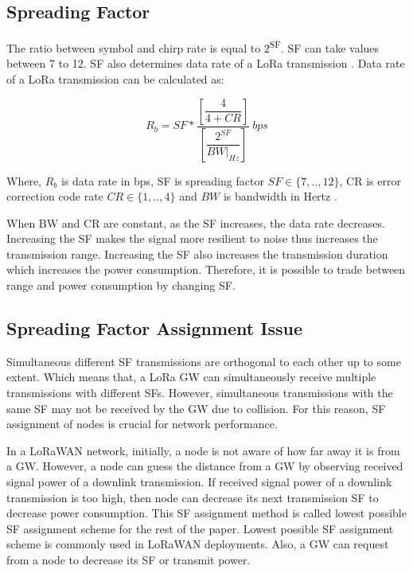 \documentclass[conference]{IEEEtran}
\begin{document}
\subsection{Spreading Factor}
\par The ratio between symbol and chirp rate is equal to $2$\textsuperscript{SF}. SF can take values between 7 to 12. SF also determines data rate of a LoRa transmission \cite{AN1200.22}. Data rate of a LoRa transmission can be calculated as:

\begin{equation} \label{eq:bit_rate_sf}
R_{b} = SF * \dfrac{\left[ \dfrac{4}{4+CR} \right] }{ \left[ \dfrac{2^{SF}}{BW|_{Hz}} \right]} \ bps
\end{equation}

Where, $R_{b}$ is data rate in bps, SF is spreading factor $SF \in \{7,..,12\}$, CR is error correction code rate $CR \in \{1,..,4\}$ and $BW$ is bandwidth in Hertz \cite{AN1200.22}.

\par When BW and CR are constant, as the SF increases, the data rate decreases. Increasing the SF makes the signal more resilient to noise thus increases the transmission range. Increasing the SF also increases the transmission duration which increases the power consumption. Therefore, it is possible to trade between range and power consumption by changing SF.

\subsection{Spreading Factor Assignment Issue}
\par Simultaneous different SF transmissions are orthogonal to each other up to some extent. Which means that, a LoRa GW can simultaneously receive multiple transmissions with different SFs. However, simultaneous transmissions with the same SF may not be received by the GW due to collision. For this reason, SF assignment of nodes is crucial for network performance.

\par In a LoRaWAN network, initially, a node is not aware of how far away it is from a GW. However, a node can guess the distance from a GW by observing received signal power of a downlink transmission. If received signal power of a downlink transmission is too high, then node can decrease its next transmission SF to decrease power consumption. This SF assignment method is called lowest possible SF assignment scheme for the rest of the paper. Lowest possible SF assignment scheme is commonly used in LoRaWAN deployments. Also, a GW can request from a node to decrease its SF or transmit power.
\end{document}

